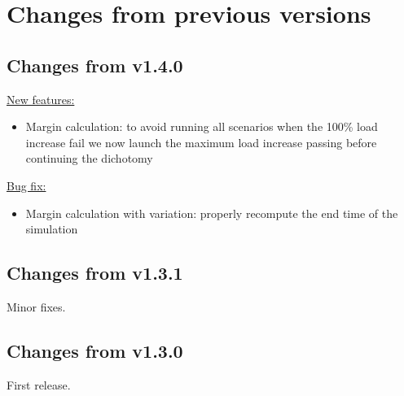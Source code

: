 \documentclass[a4paper, 12pt]{report}
\begin{document}
\section{Changes from previous versions}

\subsection{Changes from v1.4.0}

\underline{New features:}
\begin{itemize}
\item Margin calculation: to avoid running all scenarios when the 100\% load increase fail we now launch the maximum load increase passing before continuing the dichotomy
\end{itemize}

\underline{Bug fix:}
\begin{itemize}
\item Margin calculation with variation: properly recompute the end time of the simulation
\end{itemize}

\subsection{Changes from v1.3.1}
Minor fixes.

\subsection{Changes from v1.3.0}
First release.
\end{document}
